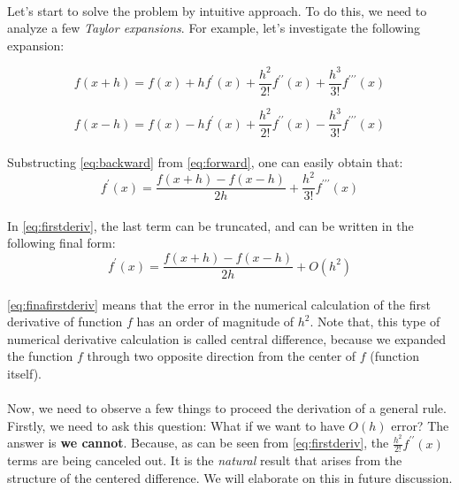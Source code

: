 \documentclass[letterpaper,12pt]{article}
\begin{document}
\paragraph{} Let's start to solve the problem by intuitive approach. To do this, we need to analyze a few \textit{Taylor expansions}. For example, let's investigate the following expansion:

\begin{equation}
    \label{eq:forward}
    f(x+h) = f(x) + hf^\prime(x) + \frac{h^2}{2!}f^{\prime\prime}(x) +  \frac{h^3}{3!}f^{\prime\prime\prime}(x)
\end{equation}

\begin{equation}
    \label{eq:backward}
    f(x-h) = f(x) - hf^\prime(x) + \frac{h^2}{2!}f^{\prime\prime}(x) -  \frac{h^3}{3!}f^{\prime\prime\prime}(x)
\end{equation}

\paragraph{}Substructing   \eqref{eq:backward} from   \eqref{eq:forward}, one can easily obtain that:
\begin{equation}
    \label{eq:firstderiv}
    f^\prime(x) = \frac{f(x+h) - f(x-h) }{2h} + \frac{h^2}{3!}f^{\prime\prime\prime}(x)
\end{equation}

\paragraph{} In   \eqref{eq:firstderiv}, the last term can be truncated, and can be written in the following final form:
\begin{equation}
    \label{eq:finafirstderiv}
    f^\prime(x) = \frac{f(x+h) - f(x-h) }{2h} + O(h^2)
\end{equation}

\paragraph{}  \eqref{eq:finafirstderiv} means that the error in the numerical calculation of the first derivative of function $f$ has an order of magnitude of $h^2$. Note that, this type of numerical derivative calculation is called central difference, because we expanded the function $f$ through two opposite direction from the center of $f$ (function itself). 

\paragraph{} Now, we need to observe a few things to proceed the derivation of a general rule. Firstly, we need to ask this question: What if we want to have $O(h)$ error? The answer is \textbf{we cannot}. Because, as can be seen from   \eqref{eq:firstderiv}, the $\frac{h^2}{2!}f^{\prime\prime}(x)$ terms are being canceled out. It is the \textit{natural} result that arises from the structure of the centered difference. We will elaborate on this in future discussion.
\end{document}
